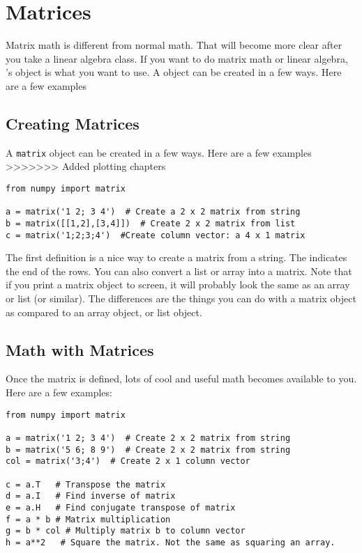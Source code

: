 \section{Matrices}
Matrix math is different from normal math.  That will become more
clear after you take a linear algebra class.  If you want to do matrix
math or linear algebra, 's  object is what you
want to use.  A  object can be created in a few ways.  Here are
a few examples

\subsection*{Creating Matrices}
A \texttt{matrix} object can be created in a
few ways.  Here are a few examples
>>>>>>> Added plotting chapters
\begin{Verbatim}
from numpy import matrix

a = matrix('1 2; 3 4')  # Create a 2 x 2 matrix from string
b = matrix([[1,2],[3,4]])  # Create 2 x 2 matrix from list
c = matrix('1;2;3;4')  #Create column vector: a 4 x 1 matrix
\end{Verbatim}
The first definition is a nice way to create a matrix from a string.
The \code{;} indicates the end of the rows.  You can also convert a
list or array into a matrix.  Note that if you print a matrix object
to screen, it will probably look the same as an array or list (or
similar).  The differences are the things you can do with a matrix
object as compared to an array object, or list object.

\subsection*{Math with Matrices}
Once the matrix is defined, lots of cool and useful math becomes
available to you.  Here are a few examples:

\begin{Verbatim}
from numpy import matrix

a = matrix('1 2; 3 4')  # Create 2 x 2 matrix from string
b = matrix('5 6; 8 9')  # Create 2 x 2 matrix from string
col = matrix('3;4')  # Create 2 x 1 column vector

c = a.T   # Transpose the matrix
d = a.I   # Find inverse of matrix
e = a.H   # Find conjugate transpose of matrix
f = a * b # Matrix multiplication
g = b * col # Multiply matrix b to column vector
h = a**2   # Square the matrix. Not the same as squaring an array.
\end{Verbatim}



